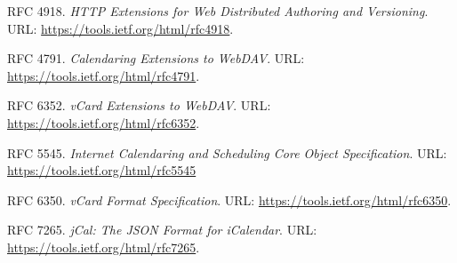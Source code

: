 \renewcommand{\refname}{RFCs}

\begin{thebibliography}{ABC}
    \setcounter{enumiv}{\value{firstbib}}

     RFC 4918. \emph{HTTP Extensions for Web Distributed Authoring and Versioning}. URL: \url{https://tools.ietf.org/html/rfc4918}.

     RFC 4791. \emph{Calendaring Extensions to WebDAV}. URL: \url{https://tools.ietf.org/html/rfc4791}.

     RFC 6352. \emph{vCard Extensions to WebDAV}. URL: \url{https://tools.ietf.org/html/rfc6352}.

     RFC 5545. \emph{Internet Calendaring and Scheduling Core Object Specification}. URL: \url{https://tools.ietf.org/html/rfc5545}

     RFC 6350. \emph{vCard Format Specification}. URL: \url{https://tools.ietf.org/html/rfc6350}.

     RFC 7265. \emph{jCal: The JSON Format for iCalendar}. URL: \url{https://tools.ietf.org/html/rfc7265}.

\end{thebibliography}
